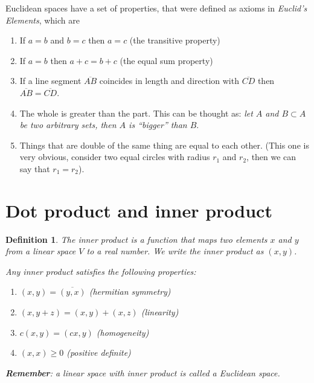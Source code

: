 \documentclass{book}
\newtheorem{definition}{Definition}[section]
\begin{document}
Euclidean spaces have a set of properties, that were defined as axioms in
\textit{Euclid's Elements}, which are
\begin{enumerate}
    \item If $a = b$ and $b = c$ then $a = c$ (the transitive property)
    \item If $a = b$ then $a + c = b + c$ (the equal sum property)
    \item If a line segment $\overline{AB}$ coincides in length and direction with
          $\overline{CD}$ then $\overline{AB} = \overline{CD}$.
    \item The whole is greater than the part. This can be thought as: \textit{let $A$ and
              $B\subset A$ be two arbitrary sets, then $A$ is ``bigger'' than $B$}.
    \item Things that are double of the same thing are equal to each other. (This one is
          very obvious, consider two equal circles with radius $r_1$ and $r_2$, then we
          can say that $r_1=r_2$).
\end{enumerate}

\section{Dot product and inner product}

\begin{definition}
    The \textit{inner product} is a function that maps two elements $x$ and $y$ from a linear space
    $V$ to a real number. We write the inner product as $\left(x,y\right)$.

    Any inner product satisfies the following properties:

    \begin{enumerate}
        \item $\left(x,y\right) = \overline{\left(y,x\right)}$ (hermitian symmetry)
        \item $\left(x,y+z\right) = \left(x,y\right) + \left(x,z\right)$ (linearity)
        \item $c\left(x,y\right) = \left(cx,y\right)$ (homogeneity)
        \item $\left(x,x\right) \geq 0$ (positive definite)
    \end{enumerate}

    \textbf{Remember}: a linear space with inner product is called a Euclidean space.
\end{definition}
\end{document}
